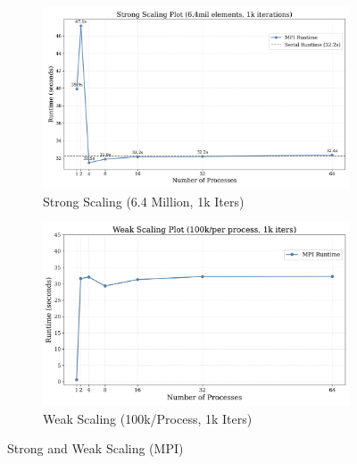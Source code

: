 \documentclass[a4paper,10pt]{article}
\begin{document}
\begin{figure}
     \centering
     \begin{subfigure}[b]{0.45\textwidth}
         \centering
         \includegraphics[width=\textwidth]{../images/3_mpi/strong_scaling.png}
         \caption{Strong Scaling (6.4 Million, 1k Iters)}
         \label{fig:3_mpi_strong_scaling}
     \end{subfigure}
     \hfill
     \begin{subfigure}[b]{0.45\textwidth}
         \centering
         \includegraphics[width=\textwidth]{../images/3_mpi/weak_scaling.png}
         \caption{Weak Scaling (100k/Process, 1k Iters)}
         \label{fig:3_mpi_weak_scaling}
     \end{subfigure}
     \caption{Strong and Weak Scaling (MPI) }
     \label{fig:3_mpi_strong_weak}
\end{figure}
\end{document}
